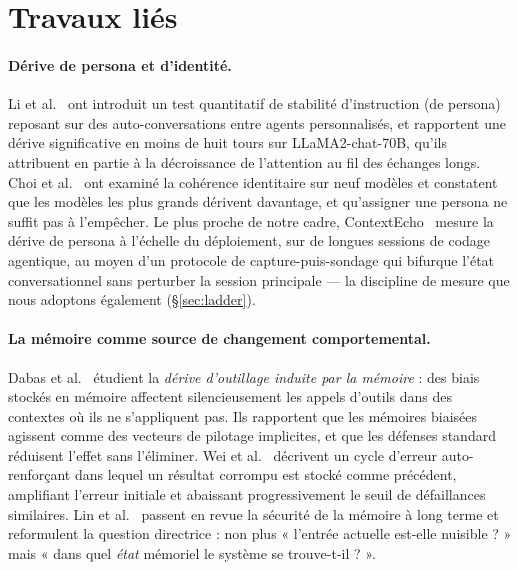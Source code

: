 \documentclass[11pt]{article}
\begin{document}
\section{Travaux liés}

\paragraph{Dérive de persona et d'identité.}
Li et al.~\cite{li2024persona} ont introduit un test quantitatif de stabilité
d'instruction (de persona) reposant sur des auto-conversations entre agents
personnalisés, et rapportent
une dérive significative en moins de huit tours sur LLaMA2-chat-70B, qu'ils attribuent
en partie à la décroissance de l'attention au fil des échanges longs. Choi
et al.~\cite{choi2024identity} ont examiné la cohérence identitaire sur neuf modèles
et constatent que les modèles les plus grands dérivent davantage, et qu'assigner une
persona ne suffit pas à l'empêcher. Le plus proche de notre cadre,
ContextEcho~\cite{contextecho2026} mesure la dérive de persona à l'échelle du
déploiement, sur de longues sessions de codage agentique, au moyen d'un protocole de
capture-puis-sondage qui bifurque l'état conversationnel sans perturber la session
principale --- la discipline de mesure que nous adoptons également
(\S\ref{sec:ladder}).

\paragraph{La mémoire comme source de changement comportemental.}
Dabas et al.~\cite{dabas2026tooldrift} étudient la \emph{dérive d'outillage induite
par la mémoire} : des biais stockés en mémoire affectent silencieusement les appels
d'outils dans des contextes où ils ne s'appliquent pas. Ils rapportent que les
mémoires biaisées agissent comme des vecteurs de pilotage implicites, et que les
défenses standard réduisent l'effet sans l'éliminer. Wei
et al.~\cite{wei2025amemguard} décrivent un cycle d'erreur auto-renforçant dans lequel
un résultat corrompu est stocké comme précédent, amplifiant l'erreur initiale et
abaissant progressivement le seuil de défaillances similaires. Lin
et al.~\cite{lin2026survey} passent en revue la sécurité de la mémoire à long terme et
reformulent la question directrice : non plus « l'entrée actuelle est-elle nuisible ? »
mais « dans quel \emph{état} mémoriel le système se trouve-t-il ? ».
\end{document}
